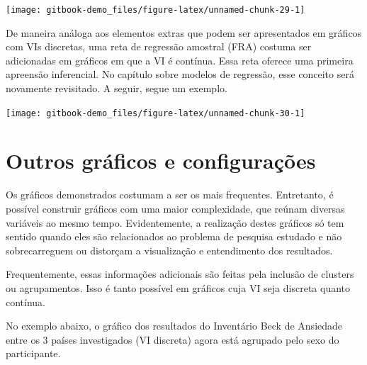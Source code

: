 \documentclass[
]{book}
\newenvironment{Shaded}{\begin{snugshade}}{\end{snugshade}}
\newcommand{\DataTypeTok}[1]{\textcolor[rgb]{0.13,0.29,0.53}{#1}}
\newcommand{\KeywordTok}[1]{\textcolor[rgb]{0.13,0.29,0.53}{\textbf{#1}}}
\newcommand{\NormalTok}[1]{#1}
\newcommand{\OperatorTok}[1]{\textcolor[rgb]{0.81,0.36,0.00}{\textbf{#1}}}
\newcommand{\StringTok}[1]{\textcolor[rgb]{0.31,0.60,0.02}{#1}}
\begin{document}
\begin{center}\texttt{[image: gitbook-demo\_files/figure-latex/unnamed-chunk-29-1]} \end{center}

De maneira análoga aos elementos extras que podem ser apresentados em
gráficos com VIs discretas, uma reta de regressão amostral (FRA) costuma
ser adicionadas em gráficos em que a VI é contínua. Essa reta oferece
uma primeira apreensão inferencial. No capítulo sobre modelos de
regressão, esse conceito será novamente revisitado. A seguir, segue um
exemplo.

\begin{Shaded}
\end{Shaded}

\begin{center}\texttt{[image: gitbook-demo\_files/figure-latex/unnamed-chunk-30-1]} \end{center}

\hypertarget{outros-gruxe1ficos-e-configurauxe7uxf5es}{%
\section{Outros gráficos e
configurações}\label{outros-gruxe1ficos-e-configurauxe7uxf5es}}

Os gráficos demonstrados costumam a ser os mais frequentes. Entretanto,
é possível construir gráficos com uma maior complexidade, que reúnam
diversas variáveis ao mesmo tempo. Evidentemente, a realização destes
gráficos só tem sentido quando eles são relacionados ao problema de
pesquisa estudado e não sobrecarreguem ou distorçam a visualização e
entendimento dos resultados.

Frequentemente, essas informações adicionais são feitas pela inclusão de
clusters ou agrupamentos. Isso é tanto possível em gráficos cuja VI seja
discreta quanto contínua.

No exemplo abaixo, o gráfico dos resultados do Inventário Beck de
Ansiedade entre os 3 países investigados (VI discreta) agora está
agrupado pelo sexo do participante.
\end{document}

